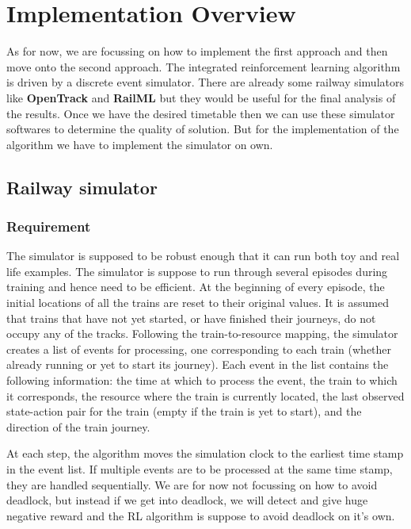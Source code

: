 \chapter{Implementation Overview}

As for now, we are focussing on how to implement the first approach 
and then move onto the second approach. The integrated reinforcement learning algorithm is driven
by a discrete event simulator. There are already some railway simulators like \textbf{OpenTrack} \cite{WEBSITE:2} and \textbf{RailML}\cite{WEBSITE:3} but they
would be useful for the final analysis of the results. Once we have the desired timetable then we can use these 
simulator softwares to determine the quality of solution. But for the implementation of the 
algorithm we have to implement the simulator on own.

\section {Railway simulator}
\subsection{Requirement}
The simulator is supposed to be robust enough that it can run both toy and real life 
examples. 
The simulator is suppose to run through several episodes during training and hence need 
to be efficient. At the
beginning of every episode, the initial locations of all the trains
are reset to their original values. It is assumed that trains that have not yet started, 
or have finished their journeys, do not
occupy any of the tracks. Following the train-to-resource mapping, 
the simulator creates a list of events for processing, one
corresponding to each train (whether already running or yet to
start its journey). Each event in the list contains the following
information: the time at which to process the event, the train to
which it corresponds, the resource where the train is currently
located, the last observed state-action pair for the train (empty
if the train is yet to start), and the direction of the train journey. 

\vspace{\baselineskip}
At each step, the algorithm moves the simulation clock to
the earliest time stamp in the event list. If multiple events are to
be processed at the same time stamp, they are handled sequentially. We are for now 
not focussing on how to avoid deadlock, but instead if we get into deadlock, we will detect and give huge
negative reward and the RL algorithm is suppose to avoid deadlock on it's own.


